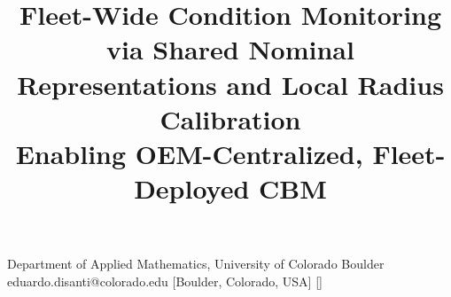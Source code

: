 \documentclass[numbered]{trbunofficial}
\begin{document}
\title{Fleet-Wide Condition Monitoring via Shared Nominal Representations and Local Radius Calibration\\[0.4em]
\large Enabling OEM-Centralized, Fleet-Deployed CBM}

{Department of Applied Mathematics, University of Colorado Boulder}
{eduardo.disanti@colorado.edu}
[Boulder, Colorado, USA]
[]


\maketitle

\end{document}
